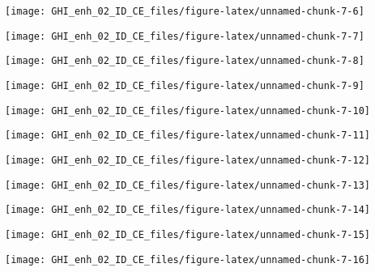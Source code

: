 \documentclass[
  10pt,
  a4paper,oneside]{article}
\begin{document}
\begin{center}\texttt{[image: GHI\_enh\_02\_ID\_CE\_files/figure-latex/unnamed-chunk-7-6]} \end{center}

\begin{center}\texttt{[image: GHI\_enh\_02\_ID\_CE\_files/figure-latex/unnamed-chunk-7-7]} \end{center}

\begin{center}\texttt{[image: GHI\_enh\_02\_ID\_CE\_files/figure-latex/unnamed-chunk-7-8]} \end{center}

\begin{center}\texttt{[image: GHI\_enh\_02\_ID\_CE\_files/figure-latex/unnamed-chunk-7-9]} \end{center}

\begin{center}\texttt{[image: GHI\_enh\_02\_ID\_CE\_files/figure-latex/unnamed-chunk-7-10]} \end{center}

\begin{center}\texttt{[image: GHI\_enh\_02\_ID\_CE\_files/figure-latex/unnamed-chunk-7-11]} \end{center}

\begin{center}\texttt{[image: GHI\_enh\_02\_ID\_CE\_files/figure-latex/unnamed-chunk-7-12]} \end{center}

\begin{center}\texttt{[image: GHI\_enh\_02\_ID\_CE\_files/figure-latex/unnamed-chunk-7-13]} \end{center}

\begin{center}\texttt{[image: GHI\_enh\_02\_ID\_CE\_files/figure-latex/unnamed-chunk-7-14]} \end{center}

\begin{center}\texttt{[image: GHI\_enh\_02\_ID\_CE\_files/figure-latex/unnamed-chunk-7-15]} \end{center}

\begin{center}\texttt{[image: GHI\_enh\_02\_ID\_CE\_files/figure-latex/unnamed-chunk-7-16]} \end{center}
\end{document}
